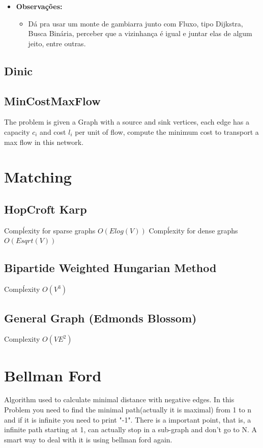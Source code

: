     \begin{itemize}
        \item \textbf{Observações:}
        \begin{itemize}
            \item Dá pra usar um monte de gambiarra junto com Fluxo, tipo Dijkstra, Busca Binária, perceber que a vizinhança é igual e juntar elas de algum jeito, entre outras.
        \end{itemize}
    \end{itemize}
    
    \subsection{Dinic}
        
    \subsection{MinCostMaxFlow}
            The problem is given a Graph with a source and sink vertices, each edge has a capacity $c_i$ and cost $l_i$ per unit of flow, compute the minimum cost to transport a max flow in this network.

            

    \section{Matching}
         \subsection{HopCroft Karp}
            Compĺexity for sparse graphs $O(E log(V))$
            Compĺexity for dense graphs $O(E sqrt(V))$
            
        \subsection{Bipartide Weighted Hungarian Method}
        Compĺexity $O(V^3)$
        
        \subsection{General Graph (Edmonds Blossom)}
        Complexity $O(VE^2)$
        
    \section{Bellman Ford}
        Algorithm used to calculate minimal distance with negative edges. In this Problem you need to find the minimal path(actually it is maximal) from 1 to n and if it is infinite you need to print "-1".
        There is a important point, that is, a infinite path starting at 1, can actually stop in a sub-graph and don't go to N. A smart way  to deal with it is using bellman ford again.


